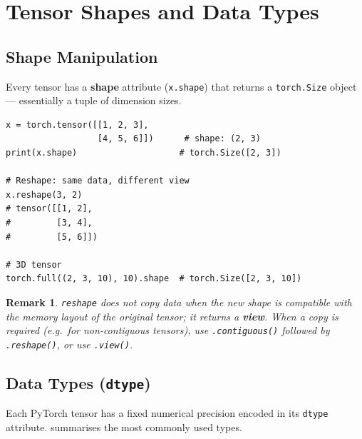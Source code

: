 \documentclass[12pt,a4paper]{article}
\newtheorem{remark}{Remark}[section]
\newcommand{\tbf}[1]{\textbf{#1}}
\newcommand{\ttt}[1]{\texttt{#1}}
\begin{document}
\section{Tensor Shapes and Data Types}
\label{sec:shapes-dtypes}

\subsection{Shape Manipulation}
\label{subsec:shapes}

Every tensor has a \tbf{shape} attribute (\ttt{x.shape}) that returns a
\ttt{torch.Size} object --- essentially a tuple of dimension sizes.

\begin{lstlisting}[caption={Shape inspection and reshape (V09, 00:37:35).},
                   label={lst:shapes}]
x = torch.tensor([[1, 2, 3],
                  [4, 5, 6]])      # shape: (2, 3)
print(x.shape)                    # torch.Size([2, 3])

# Reshape: same data, different view
x.reshape(3, 2)
# tensor([[1, 2],
#         [3, 4],
#         [5, 6]])

# 3D tensor
torch.full((2, 3, 10), 10).shape  # torch.Size([2, 3, 10])
\end{lstlisting}

\begin{remark}
\label{rem:reshape}
\ttt{reshape} does not copy data when the new shape is compatible with the
memory layout of the original tensor; it returns a \tbf{view}. When a copy
is required (e.g.\ for non-contiguous tensors), use \ttt{.contiguous()}
followed by \ttt{.reshape()}, or use \ttt{.view()}.
\end{remark}

\subsection{Data Types (\ttt{dtype})}
\label{subsec:dtypes}

Each PyTorch tensor has a fixed numerical precision encoded in its \ttt{dtype}
attribute.  summarises the most commonly used types.
\end{document}
